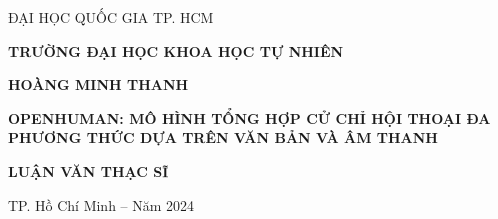 \begin{titlepage}

\begin{mdframed}[linewidth=1pt, %
	linecolor=black, %
	leftmargin=0, %
	rightmargin=0, %
	innertopmargin=20mm, %
	innerbottommargin=20mm, %
	innerleftmargin=25mm, %
	innerrightmargin=25mm, %
	skipabove=0, %
	skipbelow=0] %
	
	\centering
	\vspace*{1cm}
	
	{\large	ĐẠI HỌC QUỐC GIA TP. HCM\par}
	\vspace{0.25cm}
	{\large \textbf{TRƯỜNG ĐẠI HỌC KHOA HỌC TỰ NHIÊN}\par}
	
	\vspace{2cm}
	
	{\large \MakeUppercase{\textbf{HOÀNG MINH THANH}}\par}
	
	\vspace{2cm}
	
	{\Large \bfseries
		OPENHUMAN: MÔ HÌNH TỔNG HỢP CỬ CHỈ HỘI THOẠI ĐA PHƯƠNG THỨC DỰA TRÊN VĂN BẢN VÀ ÂM THANH\par}
	
	\vspace{3cm}
	
	{\large \bfseries
		LUẬN VĂN THẠC SĨ\par}
		
	\vfill
	\vspace{3cm}
	
	{\small TP. Hồ Chí Minh – Năm 2024 \par}
\end{mdframed}
\end{titlepage}

\pagebreak






